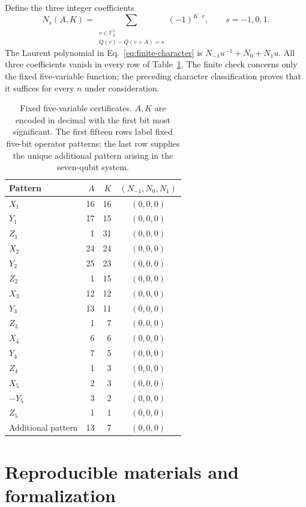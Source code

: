 \documentclass[11pt,a4paper]{article}
\numberwithin{equation}{section}
\theoremstyle{definition}
\newcommand{\F}{\mathbb F}
\begin{document}
Define the three integer coefficients
\begin{equation}
 N_s(A,K)=\sum_{\substack{v\in\F_2^5\\Q(v)-Q(v+A)=s}}(-1)^{K\cdot v},
 \qquad s=-1,0,1.
 \label{eq:certificate}
\end{equation}
The Laurent polynomial in Eq.~\eqref{eq:finite-character} is $N_{-1}u^{-1}+N_0+N_1u$. All three coefficients vanish in every row of Table~\ref{tab:certificate}. The finite check concerns only the fixed five-variable function; the preceding character classification proves that it suffices for every $n$ under consideration.

\begin{table}[htbp]
\centering
\caption{Fixed five-variable certificates. $A,K$ are encoded in decimal with the first bit most significant. The first fifteen rows label fixed five-bit operator patterns; the last row supplies the unique additional pattern arising in the seven-qubit system.}
\label{tab:certificate}
\small
\renewcommand{\arraystretch}{1.1}
\begin{tabular}{@{}lrrc@{}}
\toprule
Pattern & $A$ & $K$ & $(N_{-1},N_0,N_1)$\\
\midrule
$X_1$ &16&16&$(0,0,0)$\\
$Y_1$ &17&15&$(0,0,0)$\\
$Z_1$ &1&31&$(0,0,0)$\\
$X_2$ &24&24&$(0,0,0)$\\
$Y_2$ &25&23&$(0,0,0)$\\
$Z_2$ &1&15&$(0,0,0)$\\
$X_3$ &12&12&$(0,0,0)$\\
$Y_3$ &13&11&$(0,0,0)$\\
$Z_3$ &1&7&$(0,0,0)$\\
$X_4$ &6&6&$(0,0,0)$\\
$Y_4$ &7&5&$(0,0,0)$\\
$Z_4$ &1&3&$(0,0,0)$\\
$X_5$ &2&3&$(0,0,0)$\\
$-Y_5$ &3&2&$(0,0,0)$\\
$Z_5$ &1&1&$(0,0,0)$\\
Additional pattern &13&7&$(0,0,0)$\\
\bottomrule
\end{tabular}
\end{table}

\FloatBarrier
\section{Reproducible materials and formalization}
\label{app:reproducibility}
\end{document}

